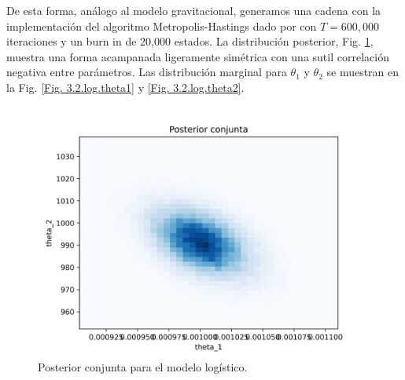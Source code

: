 De esta forma, análogo al modelo gravitacional, generamos una cadena con la implementación del algoritmo Metropolis-Hastings dado por \cite{christen2010general} con $T = 600,000$ iteraciones y un burn in de 20,000 estados. La distribución posterior, Fig. \ref{Fig. 3.2.log.conjunta}, muestra una forma acampanada ligeramente simétrica con una sutil correlación negativa entre parámetros. Las distribución marginal para $\theta_1$ y $\theta_2$ se muestran en la Fig. \ref{Fig. 3.2.log.theta1} y \ref{Fig. 3.2.log.theta2}.

\begin{figure}
    \centering 
    \includegraphics[width = 10 cm ]{img/Exp_Central_logistico_sigma/Figuras/Generales/Conjunta_logistico_sigma.png} 
    \caption{Posterior conjunta para el modelo logístico.}
    \label{Fig. 3.2.log.conjunta}
\end{figure} 





